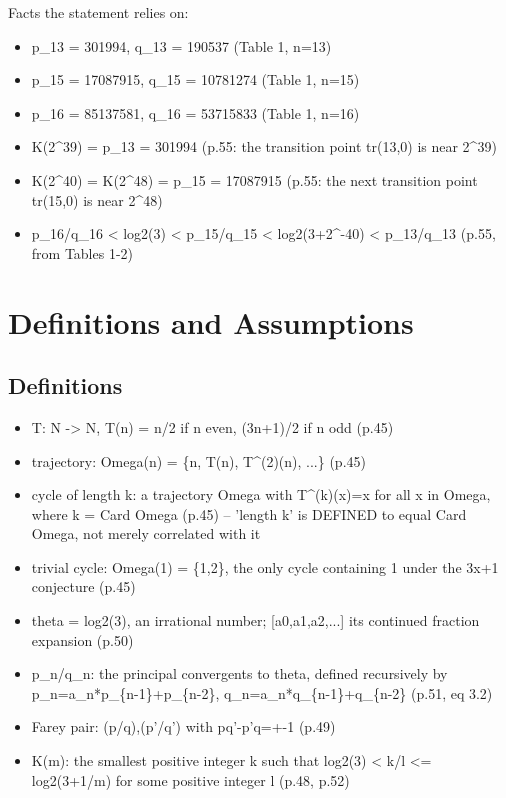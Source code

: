 \documentclass[11pt]{article}
\begin{document}
\noindent Facts the statement relies on:
\begin{itemize}
\item p\_13 = 301994, q\_13 = 190537 (Table 1, n=13)
\item p\_15 = 17087915, q\_15 = 10781274 (Table 1, n=15)
\item p\_16 = 85137581, q\_16 = 53715833 (Table 1, n=16)
\item K(2\textasciicircum{}39) = p\_13 = 301994 (p.55: the transition point tr(13,0) is near 2\textasciicircum{}39)
\item K(2\textasciicircum{}40) = K(2\textasciicircum{}48) = p\_15 = 17087915 (p.55: the next transition point tr(15,0) is near 2\textasciicircum{}48)
\item p\_16/q\_16 < log2(3) < p\_15/q\_15 < log2(3+2\textasciicircum{}-40) < p\_13/q\_13 (p.55, from Tables 1-2)
\end{itemize}
\section{Definitions and Assumptions}
\subsection*{Definitions}
\begin{itemize}
\item T: N -> N, T(n) = n/2 if n even, (3n+1)/2 if n odd (p.45)
\item trajectory: Omega(n) = \{n, T(n), T\textasciicircum{}(2)(n), ...\} (p.45)
\item cycle of length k: a trajectory Omega with T\textasciicircum{}(k)(x)=x for all x in Omega, where k = Card Omega (p.45) -- 'length k' is DEFINED to equal Card Omega, not merely correlated with it
\item trivial cycle: Omega(1) = \{1,2\}, the only cycle containing 1 under the 3x+1 conjecture (p.45)
\item theta = log2(3), an irrational number; [a0,a1,a2,...] its continued fraction expansion (p.50)
\item p\_n/q\_n: the principal convergents to theta, defined recursively by p\_n=a\_n*p\_\{n-1\}+p\_\{n-2\}, q\_n=a\_n*q\_\{n-1\}+q\_\{n-2\} (p.51, eq 3.2)
\item Farey pair: (p/q),(p'/q') with pq'-p'q=+-1 (p.49)
\item K(m): the smallest positive integer k such that log2(3) < k/l <= log2(3+1/m) for some positive integer l (p.48, p.52)
\end{itemize}
\end{document}
